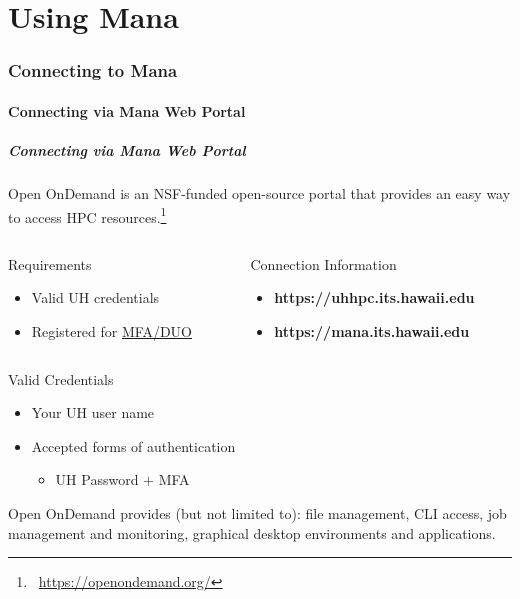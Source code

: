 \part{Using Mana}
\begin{frame}
			 \partpage
\end{frame}

\section[Connecting to Mana]{Connecting to Mana}

\subsection[Connecting via Mana Web Portal]{Connecting via Mana Web Portal}
\begin{frame}
\frametitle{Connecting via Mana Web Portal}
 \footnotesize Open OnDemand is an NSF-funded open-source  portal that provides an easy way to access HPC resources.\footnote{\label{OOD}\tiny\ \url{https://openondemand.org/}}
\begin{columns}
	\begin{column}{0.46\textwidth}
		\begin{block}{Requirements}
			\begin{itemize}
				\item Valid UH credentials 
				\item Registered for \href{http://www.hawaii.edu/its/uhlogin/}{MFA/DUO}
			\end{itemize}
                        \end{block}
	\end{column}
	\begin{column}{0.46\textwidth}
		\begin{block}{Connection Information}\
	\begin{itemize}
		  \item \textbf{https://uhhpc.its.hawaii.edu}
		  \item \textbf{https://mana.its.hawaii.edu}
		\end{itemize}
        \end{block}
	        \end{column}                
	\end{columns}
	\begin{block}{Valid Credentials}\footnotesize
		\begin{itemize}
			\item Your UH user name
			\item Accepted forms of authentication
			\begin{itemize}\scriptsize
				\item UH Password $+$ MFA 
			\end{itemize}
		\end{itemize}
	\end{block}
	\begin{center}\scriptsize
	\end{center}
 \footnotesize Open OnDemand provides (but not limited to): file management, CLI access, job management and monitoring, graphical desktop environments and applications.
\end{frame}


